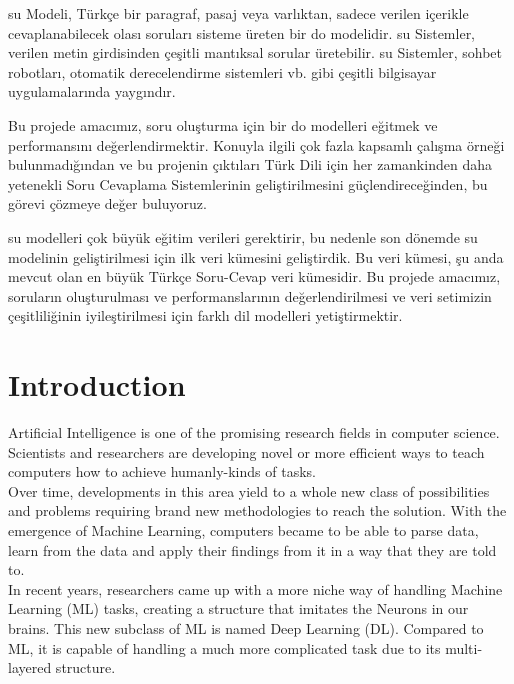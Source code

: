 \documentclass{mefsdp}
\begin{document}
		
	\begin{abstractTR}
	\gls{su} Modeli, Türkçe bir paragraf, pasaj veya varlıktan, sadece verilen içerikle cevaplanabilecek olası soruları sisteme üreten bir \gls{do} modelidir. \gls{su} Sistemler, verilen metin girdisinden çeşitli mantıksal sorular üretebilir. \gls{su} Sistemler, sohbet robotları, otomatik derecelendirme sistemleri vb. gibi çeşitli bilgisayar uygulamalarında yaygındır. \newline \par
	
	Bu projede amacımız, soru oluşturma için bir \gls{do} modelleri eğitmek ve performansını değerlendirmektir. Konuyla ilgili çok fazla kapsamlı çalışma örneği bulunmadığından ve bu projenin çıktıları Türk Dili için her zamankinden daha yetenekli Soru Cevaplama Sistemlerinin geliştirilmesini güçlendireceğinden, bu görevi çözmeye değer buluyoruz.
	\newline \par 
	\gls{su} modelleri çok büyük eğitim verileri gerektirir, bu nedenle son dönemde \gls{su} modelinin geliştirilmesi için ilk veri kümesini geliştirdik. Bu veri kümesi, şu anda mevcut olan en büyük Türkçe Soru-Cevap veri kümesidir. Bu projede amacımız, soruların oluşturulması ve performanslarının değerlendirilmesi ve veri setimizin çeşitliliğinin iyileştirilmesi için farklı dil modelleri yetiştirmektir.
			
	\end{abstractTR}
	
	\makelists
	
	\section{Introduction}
	Artificial Intelligence is one of the promising research fields in computer science. Scientists and researchers are developing novel or more efficient ways to teach computers how to achieve humanly-kinds of tasks.\\
	
	Over time, developments in this area yield to a whole new class of possibilities and problems requiring brand new methodologies to reach the solution. With the emergence of Machine Learning, computers became to be able to parse data, learn from the data and apply their findings from it in a way that they are told to.\\
	
	In recent years, researchers came up with a more niche way of handling Machine Learning (ML) tasks, creating a structure that imitates the Neurons in our brains. This new subclass of ML is named Deep Learning (DL). Compared to ML, it is capable of handling a much more complicated task due to its multi-layered structure.\\
	
\end{document}

